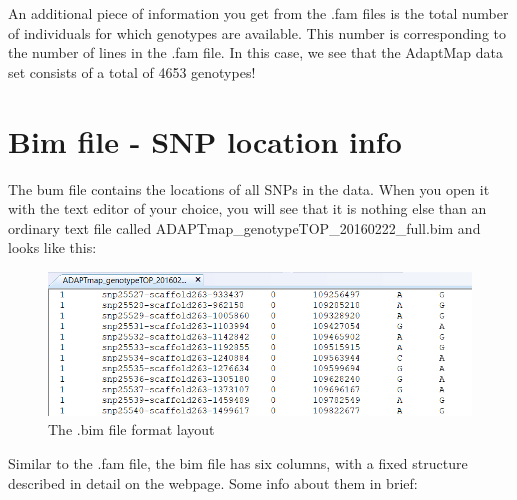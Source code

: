 \documentclass[]{book}
\begin{document}
An additional piece of information you get from the .fam files is the
total number of individuals for which genotypes are available. This
number is corresponding to the number of lines in the .fam file. In this
case, we see that the AdaptMap data set consists of a total of 4653
genotypes!

\section{Bim file - SNP location
info}\label{bim-file---snp-location-info}

The bum file contains the locations of all SNPs in the data. When you
open it with the text editor of your choice, you will see that it is
nothing else than an ordinary text file called
ADAPTmap\_genotypeTOP\_20160222\_full.bim and looks like this:

\begin{figure}
\includegraphics[width=11.17in]{images/6-3-AdaptMapBimFile} \caption{The .bim file format layout}\label{fig:fig6-3}
\end{figure}

Similar to the .fam file, the bim file has six columns, with a fixed
structure described in detail on the webpage. Some info about them in
brief:
\end{document}

